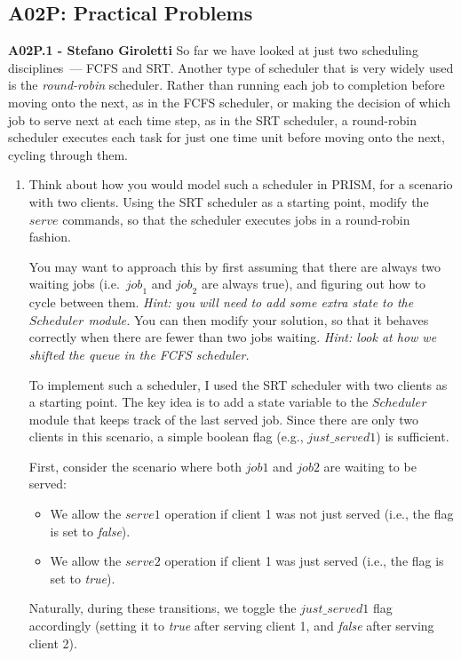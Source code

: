 \documentclass[12pt,a4paper]{article}
\newcommand{\prismident}[1]{\mathit{#1}}
\newcommand{\Pname}[1]{\prismident{#1}}
\begin{document}
\subsection*{A02P: Practical Problems}
\begin{description}
\item{\bf A02P.1 - Stefano Giroletti} So far we have looked at just two scheduling disciplines~--- FCFS and SRT. Another type of scheduler that is very widely used
is the \emph{round-robin} scheduler. Rather than running each job to completion before moving onto the next, as in the FCFS scheduler,
or making the decision of which job to serve next at each time step, as in the SRT scheduler, a round-robin scheduler executes
each task for just one time unit before moving onto the next, cycling through them.
\begin{enumerate}[label=\alph*)]
\item Think about how you would model such a scheduler in PRISM, for a scenario with two clients. Using the SRT scheduler as a starting
point, modify the $\Pname{serve}$ commands, so that the scheduler executes jobs in a round-robin fashion.
\par
You may want to approach this by first assuming that there are always two waiting jobs (i.e.\ $\Pname{job}_1$ and $\Pname{job}_2$ are always true),
and figuring out how to cycle between them. {\it Hint: you will need to add some extra state to the $\Pname{Scheduler}$ module.} You can then
modify your solution, so that it behaves correctly when there are fewer than two jobs waiting.
{\it Hint: look at how we shifted the queue in the FCFS scheduler.}
%
\ifwithanswers
\color{blue}
\par
To implement such a scheduler, I used the SRT scheduler with two clients as a starting point. The key idea is to add a state variable to the $\Pname{Scheduler}$ module that keeps track of the last served job. Since there are only two clients in this scenario, a simple boolean flag (e.g., $\Pname{just\_served1}$) is sufficient. 

First, consider the scenario where both $\Pname{job1}$ and $\Pname{job2}$ are waiting to be served:
\begin{itemize}
    \item We allow the $\Pname{serve1}$ operation if client 1 was not just served (i.e., the flag is set to \emph{false}).
    \item We allow the $\Pname{serve2}$ operation if client 1 was just served (i.e., the flag is set to \emph{true}).
\end{itemize}
Naturally, during these transitions, we toggle the $\Pname{just\_served1}$ flag accordingly (setting it to \emph{true} after serving client 1, and \emph{false} after serving client 2).


\end{enumerate}
\end{description}
\end{document}
